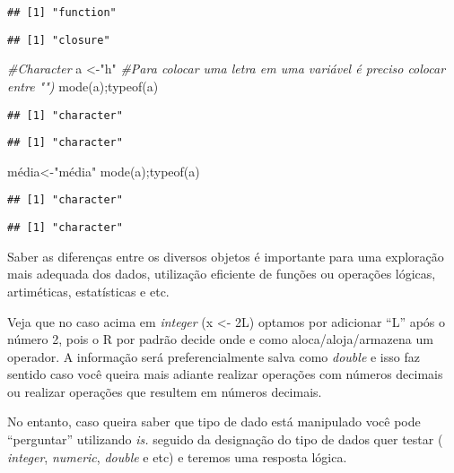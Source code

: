 \documentclass[
]{book}
\newenvironment{Shaded}{\begin{snugshade}}{\end{snugshade}}
\newcommand{\CommentTok}[1]{\textcolor[rgb]{0.56,0.35,0.01}{\textit{#1}}}
\newcommand{\FunctionTok}[1]{\textcolor[rgb]{0.00,0.00,0.00}{#1}}
\newcommand{\NormalTok}[1]{#1}
\newcommand{\OtherTok}[1]{\textcolor[rgb]{0.56,0.35,0.01}{#1}}
\newcommand{\StringTok}[1]{\textcolor[rgb]{0.31,0.60,0.02}{#1}}
\begin{document}
\begin{verbatim}
## [1] "function"
\end{verbatim}

\begin{verbatim}
## [1] "closure"
\end{verbatim}

\begin{Shaded}
\begin{Highlighting}[]
\CommentTok{\#Character}
\NormalTok{a }\OtherTok{\textless{}{-}}\StringTok{"h"} \CommentTok{\#Para colocar uma letra em uma variável é preciso colocar entre "")}
\FunctionTok{mode}\NormalTok{(a);}\FunctionTok{typeof}\NormalTok{(a)}
\end{Highlighting}
\end{Shaded}

\begin{verbatim}
## [1] "character"
\end{verbatim}

\begin{verbatim}
## [1] "character"
\end{verbatim}

\begin{Shaded}
\begin{Highlighting}[]
\NormalTok{média}\OtherTok{\textless{}{-}}\StringTok{"média"}
\FunctionTok{mode}\NormalTok{(a);}\FunctionTok{typeof}\NormalTok{(a)}
\end{Highlighting}
\end{Shaded}

\begin{verbatim}
## [1] "character"
\end{verbatim}

\begin{verbatim}
## [1] "character"
\end{verbatim}

Saber as diferenças entre os diversos objetos é importante para uma exploração mais adequada dos dados, utilização eficiente de funções ou operações lógicas, artiméticas, estatísticas e etc.

Veja que no caso acima em \emph{integer} (x \textless- 2L) optamos por adicionar ``L'' após o número 2, pois o R por padrão decide onde e como aloca/aloja/armazena um operador. A informação será preferencialmente salva como \emph{double} e isso faz sentido caso você queira mais adiante realizar operações com números decimais ou realizar operações que resultem em números decimais.

No entanto, caso queira saber que tipo de dado está manipulado você pode ``perguntar'' utilizando \emph{is.} seguido da designação do tipo de dados quer testar ( \emph{integer}, \emph{numeric}, \emph{double} e etc) e teremos uma resposta lógica.
\end{document}
